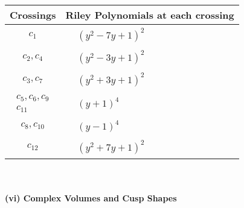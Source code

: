 \documentclass[1p]{elsarticle_modified}
\theoremstyle{definition}
\begin{document}
\begin{tabular}{m{50pt}|m{274pt}}
Crossings & \hspace{64pt}Riley Polynomials at each crossing \\
\hline $$\begin{aligned}c_{1}\end{aligned}$$&$\begin{aligned}
&(y^2-7 y+1)^2
\end{aligned}$\\
\hline $$\begin{aligned}c_{2},c_{4}\end{aligned}$$&$\begin{aligned}
&(y^2-3 y+1)^2
\end{aligned}$\\
\hline $$\begin{aligned}c_{3},c_{7}\end{aligned}$$&$\begin{aligned}
&(y^2+3 y+1)^2
\end{aligned}$\\
\hline $$\begin{aligned}c_{5},c_{6},c_{9}\\c_{11}\end{aligned}$$&$\begin{aligned}
&(y+1)^4
\end{aligned}$\\
\hline $$\begin{aligned}c_{8},c_{10}\end{aligned}$$&$\begin{aligned}
&(y-1)^4
\end{aligned}$\\
\hline $$\begin{aligned}c_{12}\end{aligned}$$&$\begin{aligned}
&(y^2+7 y+1)^2
\end{aligned}$\\
\hline
\end{tabular}\\~\\
\newpage\flushleft \textbf{(vi) Complex Volumes and Cusp Shapes}
\end{document}
